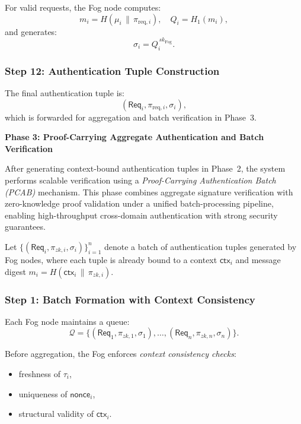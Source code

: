 \documentclass[conference]{IEEEtran}
\begin{document}
For valid requests, the Fog node computes:
\[
m_i = H(\mu_i \,\|\, \pi_{\mathrm{req},i}),
\quad
Q_i = H_1(m_i),
\]
and generates:
\[
\sigma_i = Q_i^{\,sk_{\mathrm{Fog}}}.
\]

\medskip

\subsubsection*{Step 12: Authentication Tuple Construction}

The final authentication tuple is:
\[
(\mathsf{Req}_i, \pi_{\mathrm{req},i}, \sigma_i),
\]
which is forwarded for aggregation and batch verification in Phase~3.

\medskip




\textbf{Phase 3: Proof-Carrying Aggregate Authentication and Batch Verification}
\label{sec:phase3}

After generating context-bound authentication tuples in Phase~2, the system performs scalable verification using a \emph{Proof-Carrying Authentication Batch (PCAB)} mechanism. This phase combines aggregate signature verification with zero-knowledge proof validation under a unified batch-processing pipeline, enabling high-throughput cross-domain authentication with strong security guarantees.

Let $\{(\mathsf{Req}_i, \pi_{zk,i}, \sigma_i)\}_{i=1}^{n}$ denote a batch of authentication tuples generated by Fog nodes, where each tuple is already bound to a context $\mathsf{ctx}_i$ and message digest $m_i = H(\mathsf{ctx}_i \,\|\, \pi_{zk,i})$.

\subsubsection*{Step 1: Batch Formation with Context Consistency}

Each Fog node maintains a queue:
\[
\mathcal{Q} = \{(\mathsf{Req}_1, \pi_{zk,1}, \sigma_1), \ldots, (\mathsf{Req}_n, \pi_{zk,n}, \sigma_n)\}.
\]

Before aggregation, the Fog enforces \emph{context consistency checks}:
\begin{itemize}
    \item freshness of $\tau_i$,
    \item uniqueness of $\mathsf{nonce}_i$,
    \item structural validity of $\mathsf{ctx}_i$.
\end{itemize}
\end{document}
